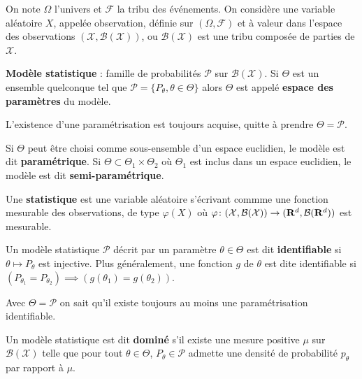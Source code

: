 On note $\Omega$ l'univers et $\mathcal{F}$ la tribu des événements.
On considère une variable aléatoire $X$, appelée observation, définie sur $(\Omega, \mathcal{F})$ et à valeur dans l'espace des observations $(\mathcal{X}, \mathcal{B}(\mathcal{X}))$, ou $\mathcal{B}(\mathcal{X})$ est une tribu composée de parties de $\mathcal{X}$.

\begin{defn}
	\textbf{Modèle statistique} : famille de probabilités $\mathcal{P}$ sur $\mathcal{B}(\mathcal{X})$.
	Si $\Theta$ est un ensemble quelconque tel que $\mathcal{P} = \{ P_\theta, \theta \in \Theta \}$ alors $\Theta$ est appelé \textbf{espace des paramètres} du modèle.
\end{defn}

\begin{rem}
	L'existence d'une paramétrisation est toujours acquise, quitte à prendre $\Theta = \mathcal{P}$.
\end{rem}

Si $\Theta$ peut être choisi comme sous-ensemble d'un espace euclidien, le modèle est dit \textbf{paramétrique}.
Si $\Theta \subset \Theta_1 \times \Theta_2$ où $\Theta_1$ est inclus dans un espace euclidien, le modèle est dit \textbf{semi-paramétrique}.

\begin{defn}
	Une \textbf{statistique} est une variable aléatoire s'écrivant commme une fonction mesurable des observations, de type $\varphi(X)$ où $\varphi \colon (\mathcal{X}, \mathcal{B}(\mathcal{X})) \to (\mathbf{R}^d, \mathcal{B}(\mathbf{R}^d))$ est mesurable.
\end{defn}

\begin{defn}[Identifiabilité]
	Un modèle statistique $\mathcal{P}$ décrit par un paramètre $\theta \in \Theta$ est dit \textbf{identifiable} si $\theta \mapsto P_\theta$ est injective.
	Plus généralement, une fonction $g$ de $\theta$ est dite identifiable si $\left( P_{\theta_1} = P_{\theta_2} \right) \implies \left( g(\theta_1) = g(\theta_2) \right)$.
\end{defn}

\begin{rem}
	Avec $\Theta = \mathcal{P}$ on sait qu'il existe toujours au moins une paramétrisation identifiable.
\end{rem}

\begin{defn}
	Un modèle statistique est dit \textbf{dominé} s'il existe une mesure positive $\mu$ sur $\mathcal{B}(\mathcal{X})$ telle que pour tout $\theta \in \Theta$, $P_\theta \in \mathcal{P}$ admette une densité de probabilité $p_\theta$ par rapport à $\mu$.
\end{defn}
